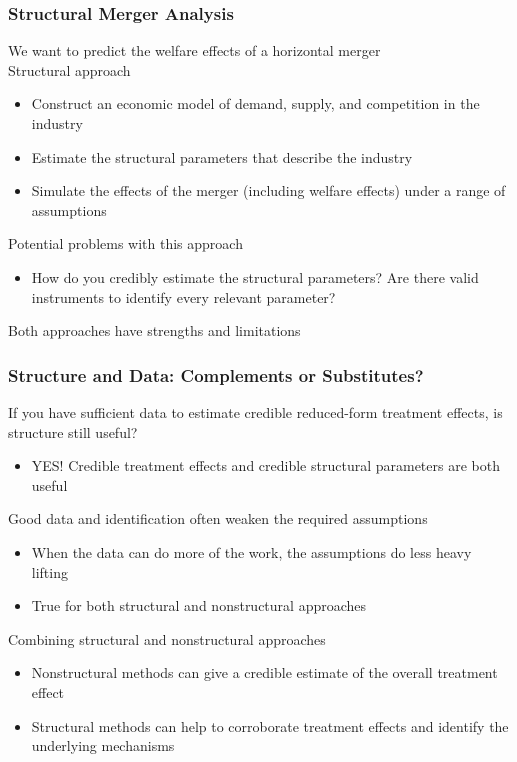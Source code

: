 \documentclass{beamer}
\begin{document}
\begin{frame}\frametitle{Structural Merger Analysis}
    We want to predict the welfare effects of a horizontal merger \\
    \vspace{2ex}
    Structural approach
    \begin{itemize}
    	\item Construct an economic model of demand, supply, and competition in the industry
    	\item Estimate the structural parameters that describe the industry
    	\item Simulate the effects of the merger (including welfare effects) under a range of assumptions
    \end{itemize}
    \vspace{2ex}
    Potential problems with this approach
    \begin{itemize}
    	\item How do you credibly estimate the structural parameters? Are there valid instruments to identify every relevant parameter?
    \end{itemize}
    \vspace{2ex}
    Both approaches have strengths and limitations
\end{frame}

\begin{frame}\frametitle{Structure and Data: Complements or Substitutes?}
    If you have sufficient data to estimate credible reduced-form treatment effects, is structure still useful?
    \begin{itemize}
    	\item YES! Credible treatment effects and credible structural parameters are both useful
    \end{itemize}
    \vspace{2ex}
    Good data and identification often weaken the required assumptions
    \begin{itemize}
    	\item When the data can do more of the work, the assumptions do less heavy lifting
    	\item True for both structural and nonstructural approaches
    \end{itemize}
    \vspace{2ex}
    Combining structural and nonstructural approaches
    \begin{itemize}
    	\item Nonstructural methods can give a credible estimate of the overall treatment effect
    	\item Structural methods can help to corroborate treatment effects and identify the underlying mechanisms
    \end{itemize}
\end{frame}
\end{document}
